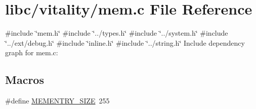 \hypertarget{a00107}{}\section{libc/vitality/mem.c File Reference}
\label{a00107}
{\ttfamily \#include \char`\"{}mem.\+h\char`\"{}}\newline
{\ttfamily \#include \char`\"{}../types.\+h\char`\"{}}\newline
{\ttfamily \#include \char`\"{}../system.\+h\char`\"{}}\newline
{\ttfamily \#include \char`\"{}../ext/debug.\+h\char`\"{}}\newline
{\ttfamily \#include \char`\"{}inline.\+h\char`\"{}}\newline
{\ttfamily \#include \char`\"{}../string.\+h\char`\"{}}\newline
Include dependency graph for mem.\+c\+:
\subsection*{Macros}
\begin{DoxyCompactItemize}
\item 
\#define \hyperlink{a00107_a48623ea6ed429e2f046b49041dde1dc5_a48623ea6ed429e2f046b49041dde1dc5}{M\+E\+M\+E\+N\+T\+R\+Y\+\_\+\+S\+I\+ZE}~255
\end{DoxyCompactItemize}
